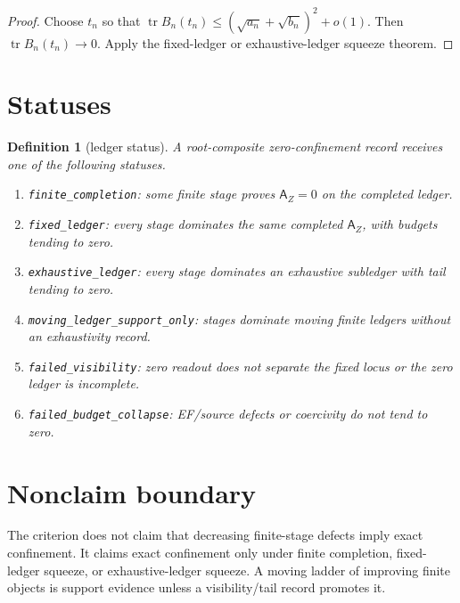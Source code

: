 \documentclass[11pt]{article}
\newtheorem{definition}[theorem]{Definition}
\newcommand{\AZ}{\mathsf A_Z}
\newcommand{\tr}{\operatorname{tr}}
\begin{document}
\begin{proof}
Choose \(t_n\) so that \(\tr B_n(t_n)\le (\sqrt{a_n}+\sqrt{b_n})^2+o(1)\).  Then \(\tr B_n(t_n)\to0\).  Apply the fixed-ledger or exhaustive-ledger squeeze theorem.
\end{proof}

\section{Statuses}

\begin{definition}[ledger status]
A root-composite zero-confinement record receives one of the following statuses.
\begin{enumerate}[label=(\roman*)]
\item \texttt{finite\_completion}: some finite stage proves \(\AZ=0\) on the completed ledger.
\item \texttt{fixed\_ledger}: every stage dominates the same completed \(\AZ\), with budgets tending to zero.
\item \texttt{exhaustive\_ledger}: every stage dominates an exhaustive subledger with tail tending to zero.
\item \texttt{moving\_ledger\_support\_only}: stages dominate moving finite ledgers without an exhaustivity record.
\item \texttt{failed\_visibility}: zero readout does not separate the fixed locus or the zero ledger is incomplete.
\item \texttt{failed\_budget\_collapse}: EF/source defects or coercivity do not tend to zero.
\end{enumerate}
\end{definition}

\section{Nonclaim boundary}
The criterion does not claim that decreasing finite-stage defects imply exact confinement.  It claims exact confinement only under finite completion, fixed-ledger squeeze, or exhaustive-ledger squeeze.  A moving ladder of improving finite objects is support evidence unless a visibility/tail record promotes it.
\end{document}
